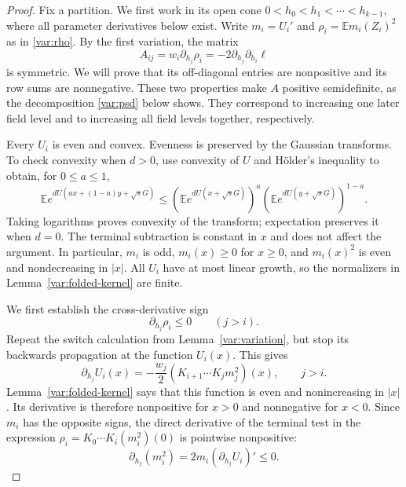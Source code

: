 \begin{proof}
Fix a partition. We first work in its open cone
$0<h_0<h_1<\cdots<h_{k-1}$, where all parameter derivatives
below exist. Write $m_i=U_i'$ and
$\rho_i=\mathbb E m_i(Z_i)^2$ as in \eqref{var:rho}.
By the first variation, the matrix
\[
 A_{ij}=w_i\partial_{h_j}\rho_i
       =-2\partial_{h_j}\partial_{h_i}\ell
\]
is symmetric. We will prove that its off-diagonal entries are
nonpositive and its row sums are nonnegative. These two properties
make $A$ positive semidefinite, as the decomposition
\eqref{var:psd} below shows. They correspond to increasing one later
field level and to increasing all field levels together, respectively.

Every $U_i$ is even and convex. Evenness is preserved by the
Gaussian transforms. To check convexity when $d>0$, use convexity
of $U$ and H\"older's inequality to obtain, for $0\le a\le1$,
\[
 \mathbb E e^{dU(ax+(1-a)y+\sqrt sG)}
 \le
 (\mathbb E e^{dU(x+\sqrt sG)})^a
 (\mathbb E e^{dU(y+\sqrt sG)})^{1-a}.
\]
Taking logarithms proves convexity of the transform; expectation
preserves it when $d=0$. The terminal subtraction is constant in
$x$ and does not affect the argument. In particular, $m_i$ is
odd, $m_i(x)\ge0$ for $x\ge0$, and $m_i(x)^2$ is even and
nondecreasing in $|x|$. All $U_i$ have at most linear growth, so
the normalizers in Lemma~\ref{var:folded-kernel} are finite.

We first establish the cross-derivative sign
\begin{equation}
\label{var:cross-sign}
 \partial_{h_j}\rho_i\le0\qquad(j>i).
\end{equation}
Repeat the switch calculation from Lemma~\ref{var:variation},
but stop its backwards propagation at the function $U_i(x)$.
This gives
\begin{equation}
\label{var:later-switch}
 \partial_{h_j}U_i(x)
 =-\frac{w_j}{2}
   (K_{i+1}\cdots K_j m_j^2)(x),\qquad j>i.
\end{equation}
Lemma~\ref{var:folded-kernel} says that this function is even
and nonincreasing in $|x|$. Its derivative is therefore
nonpositive for $x>0$ and nonnegative for $x<0$. Since $m_i$
has the opposite signs, the direct derivative of the terminal
test in the expression $\rho_i=K_0\cdots K_i(m_i^2)(0)$ is
pointwise nonpositive:
\[
 \partial_{h_j}(m_i^2)
   =2m_i(\partial_{h_j}U_i)'\le0.
\]


\end{proof}
